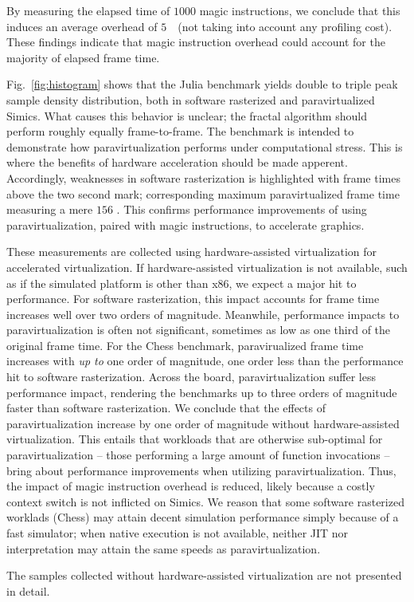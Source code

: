 By measuring the elapsed time of $1000$ magic instructions, we conclude that this induces an average overhead of $5$~\milli\second\ (not taking into account any profiling cost).
These findings indicate that magic instruction overhead could account for the majority of elapsed frame time.

Fig.~\ref{fig:histogram} shows that the Julia benchmark yields double to triple peak sample density distribution, both in software rasterized and paravirtualized Simics.
What causes this behavior is unclear; the fractal algorithm should perform roughly equally frame-to-frame.
The benchmark is intended to demonstrate how paravirtualization performs under computational stress.
This is where the benefits of hardware acceleration should be made apperent.
Accordingly, weaknesses in software rasterization is highlighted with frame times above the two second mark; corresponding maximum paravirtualized frame time measuring a mere $156$ \milli\second.
This confirms performance improvements of using paravirtualization, paired with magic instructions, to accelerate graphics.

These measurements are collected using hardware-assisted virtualization for accelerated virtualization.
If hardware-assisted virtualization is not available, such as if the simulated platform is other than x86, we expect a major hit to performance.
For software rasterization, this impact accounts for frame time increases well over two orders of magnitude.
Meanwhile, performance impacts to paravirtualization is often not significant, sometimes as low as one third of the original frame time.
For the Chess benchmark, paravirualized frame time increases with \textit{up to} one order of magnitude, one order less than the performance hit to software rasterization.
Across the board, paravirtualization suffer less performance impact, rendering the benchmarks up to three orders of magnitude faster than software rasterization.
We conclude that the effects of paravirtualization increase by one order of magnitude without hardware-assisted virtualization.
This entails that workloads that are otherwise sub-optimal for paravirtualization -- those performing a large amount of function invocations -- bring about performance improvements when utilizing paravirtualization.
Thus, the impact of magic instruction overhead is reduced, likely because a costly context switch is not inflicted on Simics.
We reason that some software rasterized worklads (Chess) may attain decent simulation performance simply because of a fast simulator; when native execution is not available, neither JIT nor interpretation may attain the same speeds as paravirtualization.

The samples collected without hardware-assisted virtualization are not presented in detail. %
